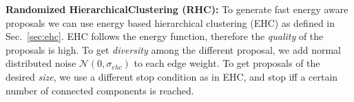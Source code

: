 \documentclass[10pt,twocolumn,letterpaper]{article}
\DeclareMathOperator*{\argmin}{arg\,min}
\DeclareMathOperator*{\argmax}{arg\,max}
\theoremstyle{definition}
\begin{document}
%



\noindent \textbf{Randomized HierarchicalClustering (RHC):}
%
To generate fast energy aware proposals we can use energy
based hierarchical clustering (EHC) as defined in Sec.~\ref{sec:ehc}.
EHC follows the energy function, therefore the \emph{quality}
of the proposals is high.
To get \emph{diversity} among the different proposal,
we add normal distributed noise  $\mathcal{N}(0, \sigma_{ehc})$
to each edge weight.
To get proposals of the desired \emph{size}, we use a
different stop condition as in EHC, and stop iff a certain number of connected
components is reached.
\end{document}
